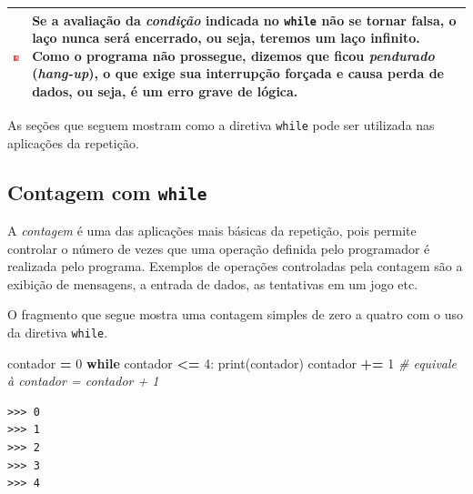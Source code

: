 \documentclass[
]{book}
\newenvironment{Shaded}{\begin{snugshade}}{\end{snugshade}}
\newcommand{\BuiltInTok}[1]{#1}
\newcommand{\CommentTok}[1]{\textcolor[rgb]{0.56,0.35,0.01}{\textit{#1}}}
\newcommand{\ControlFlowTok}[1]{\textcolor[rgb]{0.13,0.29,0.53}{\textbf{#1}}}
\newcommand{\DecValTok}[1]{\textcolor[rgb]{0.00,0.00,0.81}{#1}}
\newcommand{\NormalTok}[1]{#1}
\newcommand{\OperatorTok}[1]{\textcolor[rgb]{0.81,0.36,0.00}{\textbf{#1}}}
\begin{document}
\begin{longtable}[]{@{}
  >{\centering\arraybackslash}p{}
  >{\raggedright\arraybackslash}p{}@{}}
\toprule
\includegraphics{images/dont.png} & Se a avaliação da \emph{condição} indicada no \texttt{while} não se tornar falsa, o laço nunca será encerrado, ou seja, teremos um laço infinito. Como o programa não prossegue, dizemos que ficou \emph{pendurado} (\emph{hang-up}), o que exige sua interrupção forçada e causa perda de dados, ou seja, é um erro grave de lógica. \\
\midrule
\endhead
\bottomrule
\end{longtable}

As seções que seguem mostram como a diretiva \texttt{while} pode ser utilizada nas aplicações da repetição.

\hypertarget{repet-while-conta}{%
\subsection{\texorpdfstring{Contagem com \texttt{while}}{Contagem com while}}\label{repet-while-conta}}

A \emph{contagem} é uma das aplicações mais básicas da repetição, pois permite controlar o número de vezes que uma operação definida pelo programador é realizada pelo programa. Exemplos de operações controladas pela contagem são a exibição de mensagens, a entrada de dados, as tentativas em um jogo etc.

O fragmento que segue mostra uma contagem simples de zero a quatro com o uso da diretiva \texttt{while}.

\begin{Shaded}
\begin{Highlighting}[]
\NormalTok{contador }\OperatorTok{=} \DecValTok{0}
\ControlFlowTok{while}\NormalTok{ contador }\OperatorTok{\textless{}=} \DecValTok{4}\NormalTok{:}
    \BuiltInTok{print}\NormalTok{(contador)}
\NormalTok{    contador }\OperatorTok{+=} \DecValTok{1} \CommentTok{\# equivale à contador = contador + 1}
\end{Highlighting}
\end{Shaded}

\begin{verbatim}
>>> 0
>>> 1
>>> 2
>>> 3
>>> 4
\end{verbatim}
\end{document}

